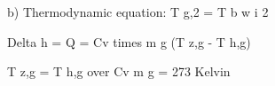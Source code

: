 b) Thermodynamic equation: T g,2 = T b w i 2

Delta h = Q = Cv times m g (T z,g - T h,g)

T z,g = T h,g over Cv m g = 273 Kelvin